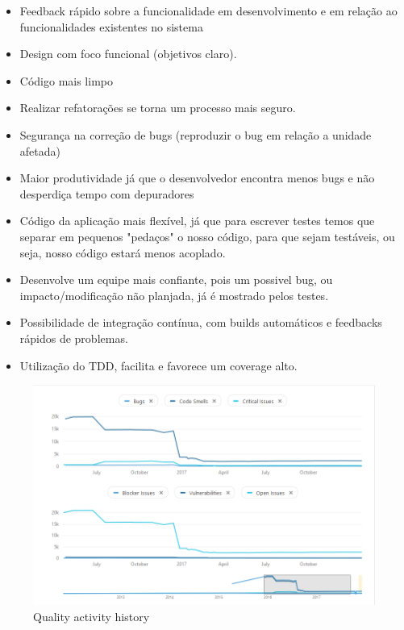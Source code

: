 \documentclass[12pt]{article}
\begin{document}
\begin{itemize}
	\item Feedback rápido sobre a funcionalidade em desenvolvimento e em relação ao funcionalidades existentes no sistema	
	\item Design com foco funcional (objetivos claro).
	\item Código mais limpo
	\item Realizar refatorações se torna um processo mais seguro.
	\item Segurança na correção de bugs (reproduzir o bug em relação a unidade afetada)
	\item Maior produtividade já que o desenvolvedor encontra menos bugs e não desperdiça tempo com depuradores
	\item Código da aplicação mais flexível, já que para escrever testes temos que separar em pequenos "pedaços" o nosso código, para que sejam testáveis, ou seja, nosso código estará menos acoplado.
	\item Desenvolve um equipe mais confiante, pois um possivel bug, ou impacto/modificação não planjada, já é mostrado pelos testes.
	\item Possibilidade de integração contínua, com builds automáticos e feedbacks rápidos de problemas.
	\item Utilização do TDD, facilita e favorece um coverage alto.
\end{itemize}

\begin{figure}[h]
	\centering
		\includegraphics[scale=0.5]{img/sonar-PMD-activity.png}
	\caption{Quality activity history}
	\label{fig:sonar-activity-history}
\end{figure}
\end{document}
